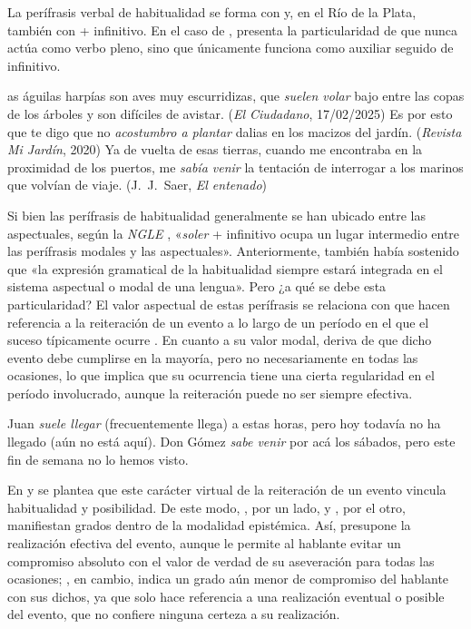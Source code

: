 \begin{recuadro}
La perífrasis verbal de habitualidad se forma con  y,
en el Río de la Plata, también con  + infinitivo. En el caso de
, presenta la particularidad de que nunca actúa como verbo pleno,
sino que únicamente funciona como auxiliar seguido de infinitivo.

\begin{exe}
  \ex [L]as águilas harpías son aves muy escurridizas, que \textit{suelen volar}
      bajo entre las copas de los árboles y son difíciles de avistar. (\textit{El
      Ciudadano}, 17/02/2025)
  \ex Es por esto que te digo que no \textit{acostumbro a plantar} dalias en los
      macizos del jardín. (\textit{Revista Mi Jardín}, 2020)
  \ex Ya de vuelta de esas tierras, cuando me encontraba en la proximidad de los
      puertos, me \textit{sabía venir} la tentación de interrogar a los marinos
      que volvían de viaje. (J.~J.~Saer, \textit{El entenado})
\end{exe}

Si bien las perífrasis de habitualidad generalmente se han ubicado entre las
aspectuales, según la \textit{NGLE} \parencite[§\,28.9b]{rae2025}, «\textit{soler}
+ infinitivo ocupa un lugar intermedio entre las perífrasis modales y las
aspectuales». Anteriormente, también \textcite[40]{comrie1985} había sostenido
que «la expresión gramatical de la habitualidad siempre estará integrada en el
sistema aspectual o modal de una lengua». Pero ¿a qué se debe esta
particularidad? El valor aspectual de estas perífrasis se relaciona con que hacen
referencia a la reiteración de un evento a lo largo de un período en el que el
suceso típicamente ocurre \parencite{olbertz1998}. En cuanto a su valor modal,
deriva de que dicho evento debe cumplirse en la mayoría, pero no necesariamente
en todas las ocasiones, lo que implica que su ocurrencia tiene una cierta
regularidad en el período involucrado, aunque la reiteración puede no ser
siempre efectiva.

\begin{exe}
  \ex Juan \textit{suele llegar} (frecuentemente llega) a estas horas, pero hoy
      todavía no ha llegado (aún no está aquí).
  \ex Don Gómez \textit{sabe venir} por acá los sábados, pero este fin de semana
      no lo hemos visto.
\end{exe}

En \textcite{giammatteo2010marcovecchio} y \textcite{giammatteo2011} se plantea
que este carácter virtual de la reiteración de un evento vincula habitualidad y
posibilidad. De este modo, , por un lado, y
, por el otro, manifiestan grados dentro de
la modalidad epistémica. Así,  presupone la realización efectiva
del evento, aunque le permite al hablante evitar un compromiso absoluto con el
valor de verdad de su aseveración para todas las ocasiones; , en
cambio, indica un grado aún menor de compromiso del hablante con sus dichos, ya
que solo hace referencia a una realización eventual o posible del evento, que no
confiere ninguna certeza a su realización.


\end{recuadro}
